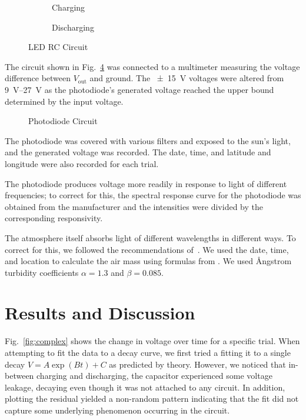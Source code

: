 \documentclass{lab}
\begin{document}
\begin{figure}[h]
  \centering
  \begin{subfigure}{0.45\textwidth}
    \centering
    
    \caption{Charging\label{fig:charging}}
  \end{subfigure}
  \hfill
  \begin{subfigure}{0.45\textwidth}
    \centering
    
    \caption{Discharging\label{fig:discharging}}
  \end{subfigure}
  \caption{LED RC Circuit\label{fig:circuit}}
\end{figure}

The circuit shown in Fig.~\ref{fig:photodiode} was connected to a multimeter
measuring the voltage difference between $V_{\text{out}}$ and ground. The
\SI{+-15}{\volt} voltages were altered from \SIrange{9}{27}{\volt} as the
photodiode's generated voltage reached the upper bound determined by the input
voltage.

\begin{figure}[h]
  \centering
  
  \caption{Photodiode Circuit\label{fig:photodiode}}
\end{figure}

The photodiode was covered with various filters and exposed to the sun's light,
and the generated voltage was recorded. The date, time, and latitude and
longitude were also recorded for each trial.

The photodiode produces voltage more readily in response to light of different
frequencies; to correct for this, the spectral response curve for the photodiode
was obtained from the manufacturer and the intensities were divided by the
corresponding responsivity.

The atmosphere itself absorbs light of different wavelengths in different ways.
To correct for this, we followed the recommendations of~\cite{nasa}. We used the
date, time, and location to calculate the air mass using formulas from
\cite{noaa}. We used Ångstrom turbidity coefficients $\alpha = 1.3$ and $\beta = 0.085$.

\section{Results and Discussion}
\label{Sec:ResDisc}

Fig.~\ref{fig:complex} shows the change in voltage over time for a specific
trial. When attempting to fit the data to a decay curve, we first tried a
fitting it to a single decay $V = A\exp(Bt) + C$ as predicted by theory.
However, we noticed that in-between charging and discharging, the capacitor
experienced some voltage leakage, decaying even though it was not attached to
any circuit. In addition, plotting the residual yielded a non-random pattern
indicating that the fit did not capture some underlying phenomenon occurring in
the circuit.
\end{document}
